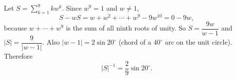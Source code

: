 Let $S=\sum_{k=1}^9kw^k$. Since $w^9=1$ and $w\ne1$,
\[S-wS=w+w^2+\cdots+w^9-9w^{10}=0-9w,\]
because $w+\cdots+w^9$ is the sum of all ninth roots of unity. So $S=\dfrac{9w}{w-1}$ and $|S|=\dfrac9{|w-1|}$. Also $|w-1|=2\sin20^\circ$ (chord of a $40^\circ$ arc on the unit circle). Therefore
\[|S|^{-1}=\boxed{\dfrac29\sin20^\circ}.\]
